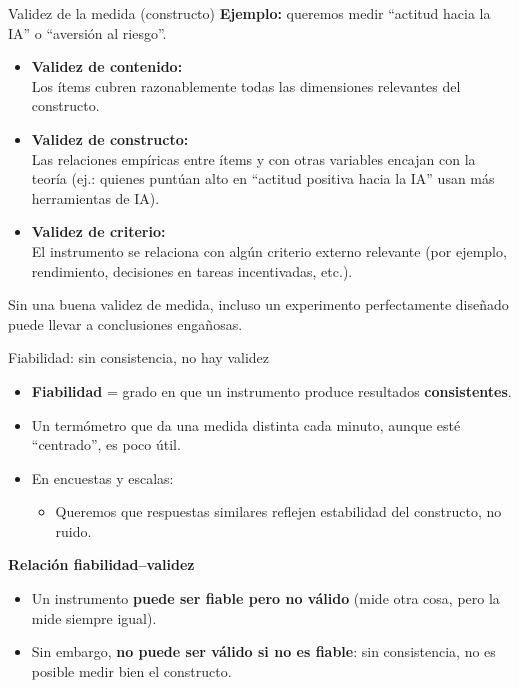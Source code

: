 ﻿\documentclass{beamer}
\begin{document}
\begin{frame}{Validez de la medida (constructo)}
    \textbf{Ejemplo:} queremos medir “actitud hacia la IA” o “aversión al riesgo”.
    \begin{itemize}
        \item \textbf{Validez de contenido:} \\
        Los ítems cubren razonablemente todas las dimensiones relevantes del constructo.
        \item \textbf{Validez de constructo:} \\
        Las relaciones empíricas entre ítems y con otras variables encajan con la teoría
        (ej.: quienes puntúan alto en “actitud positiva hacia la IA” usan más herramientas de IA).
        \item \textbf{Validez de criterio:} \\
        El instrumento se relaciona con algún criterio externo relevante
        (por ejemplo, rendimiento, decisiones en tareas incentivadas, etc.).
    \end{itemize}
    \vspace{0.2cm}
    Sin una buena validez de medida, incluso un experimento perfectamente diseñado puede llevar a conclusiones engañosas.
\end{frame}

\begin{frame}{Fiabilidad: sin consistencia, no hay validez}
    \begin{itemize}
        \item \textbf{Fiabilidad} = grado en que un instrumento produce resultados \textbf{consistentes}.
        \item Un termómetro que da una medida distinta cada minuto, aunque esté “centrado”, es poco útil.
        \item En encuestas y escalas:
        \begin{itemize}
            \item Queremos que respuestas similares reflejen estabilidad del constructo, no ruido.
        \end{itemize}
    \end{itemize}
    \vspace{0.2cm}
    \textbf{Relación fiabilidad–validez}
    \begin{itemize}
        \item Un instrumento \textbf{puede ser fiable pero no válido} (mide otra cosa, pero la mide siempre igual).
        \item Sin embargo, \textbf{no puede ser válido si no es fiable}: sin consistencia, no es posible medir bien el constructo.
    \end{itemize}
\end{frame}
\end{document}
